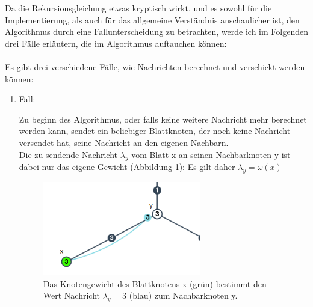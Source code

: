 Da die Rekursionsgleichung etwas kryptisch wirkt, und es sowohl für die Implementierung, als auch für das allgemeine Verständnis anschaulicher ist, den Algorithmus durch eine Fallunterscheidung zu betrachten, werde ich im Folgenden drei Fälle erläutern, die im Algorithmus auftauchen können:\\\\
Es gibt drei verschiedene Fälle, wie Nachrichten berechnet und verschickt werden können:

\begin{enumerate}
	
	\item Fall:
		
		
		
			
		Zu beginn des Algorithmus, oder falls keine weitere Nachricht mehr berechnet werden kann, sendet ein beliebiger Blattknoten, der noch keine Nachricht versendet hat, seine Nachricht an den eigenen Nachbarn.\\
		
		Die zu sendende Nachricht $\lambda_{y}$ vom Blatt x an seinen Nachbarknoten y ist dabei nur das eigene Gewicht (Abbildung \ref{abb_leaf}): Es gilt daher $\lambda_{y} = \omega(x)$
		
		\begin{figure}[htb]
			\includegraphics[width=0.65\textwidth]{bilder/abb_blattknoten.png}
			\captionsetup{width=0.65\textwidth}
			\caption{Das Knotengewicht des Blattknotens x (grün) bestimmt den Wert Nachricht $\lambda_{y} = 3$ (blau) zum Nachbarknoten y.}
			\label{abb_leaf}
		\end{figure}


\end{enumerate}
